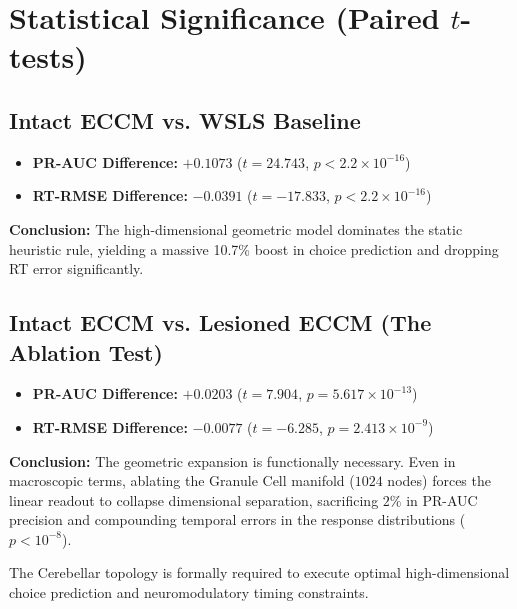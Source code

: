 \documentclass[11pt,a4paper]{article}
\begin{document}
\section{Statistical Significance (Paired $t$-tests)}

\subsection{Intact ECCM vs. WSLS Baseline}
\begin{itemize}
    \item \textbf{PR-AUC Difference:} $+0.1073$ ($t = 24.743$, $p < 2.2 \times 10^{-16}$)
    \item \textbf{RT-RMSE Difference:} $-0.0391$ ($t = -17.833$, $p < 2.2 \times 10^{-16}$)
\end{itemize}
\textbf{Conclusion:} The high-dimensional geometric model dominates the static heuristic rule, yielding a massive 10.7\% boost in choice prediction and dropping RT error significantly.

\subsection{Intact ECCM vs. Lesioned ECCM (The Ablation Test)}
\begin{itemize}
    \item \textbf{PR-AUC Difference:} $+0.0203$ ($t = 7.904$, $p = 5.617 \times 10^{-13}$)
    \item \textbf{RT-RMSE Difference:} $-0.0077$ ($t = -6.285$, $p = 2.413 \times 10^{-9}$)
\end{itemize}
\textbf{Conclusion:} The geometric expansion is functionally necessary. Even in macroscopic terms, ablating the Granule Cell manifold ($1024$ nodes) forces the linear readout to collapse dimensional separation, sacrificing $2\%$ in PR-AUC precision and compounding temporal errors in the response distributions ($p < 10^{-8}$). 

The Cerebellar topology is formally required to execute optimal high-dimensional choice prediction and neuromodulatory timing constraints.
\end{document}
